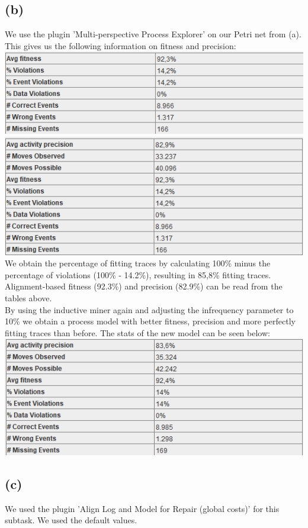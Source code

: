 \documentclass[../../main.tex]{subfiles}
\begin{document}
\subsection*{(b)}
We use the plugin 'Multi-perspective Process Explorer' on our Petri net from (a). This gives us the following information on fitness and precision:\\
\includegraphics[width=0.5\columnwidth]{img/ProM_b_fitness.png}
\includegraphics[width=0.5\columnwidth]{img/ProM_b_precision.png}\\
We obtain the percentage of fitting traces by calculating 100\% minus the percentage of violations (100\% - 14.2\%), resulting in 85,8\% fitting traces. Alignment-based fitness (92.3\%) and precision (82.9\%) can be read from the tables above.\\
By using the inductive miner again and adjusting the infrequency parameter to 10\% we obtain a process model with better fitness, precision and more perfectly fitting traces than before. The stats of the new model can be seen below:\\
\includegraphics[width=0.5\columnwidth]{img/ProM_b_model_2.png}

\subsection*{(c)}
We used the plugin 'Align Log and Model for Repair (global costs)' for this subtask. We used the default values.
\end{document}
